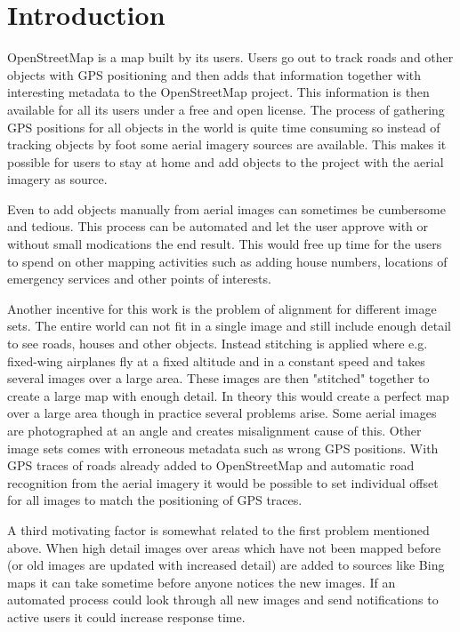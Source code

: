 \section{Introduction}
OpenStreetMap is a map built by its users. Users go out to track roads and
other objects with GPS positioning and then adds that information together with
interesting metadata to the OpenStreetMap project. This information is then
available for all its users under a free and open license. The process of
gathering GPS positions for all objects in the world is quite time consuming
so instead of tracking objects by foot some aerial imagery sources are
available. This makes it possible for users to stay at home and add objects
to the project with the aerial imagery as source.

Even to add objects manually from aerial images can sometimes be cumbersome and
tedious. This process can be automated and let the user approve with or
without small modications the end result. This would free up time for the
users to spend on other mapping activities such as adding house numbers,
locations of emergency services and other points of interests.

Another incentive for this work is the problem of alignment for
different image sets. The entire world can not fit in a single image
and still include enough detail to see roads, houses and other objects.
Instead stitching is applied where e.g. fixed-wing airplanes fly at a fixed
altitude and in a constant speed and takes several images over a large area.
These images are then "stitched" together to create a large map with enough detail.
In theory this would create a perfect map over a large area though in practice
several problems arise. Some aerial images are photographed at an angle and
creates misalignment cause of this. Other image sets comes with erroneous metadata
such as wrong GPS positions. With GPS traces of roads already added to OpenStreetMap
and automatic road recognition from the aerial imagery it would be possible to
set individual offset for all images to match the positioning of GPS traces.

A third motivating factor is somewhat related to the first problem mentioned above.
When high detail images over areas which have not been mapped before (or old
images are updated with increased detail) are added to sources like Bing maps
it can take sometime before anyone notices the new images. If an automated
process could look through all new images and send notifications to active
users it could increase response time.

